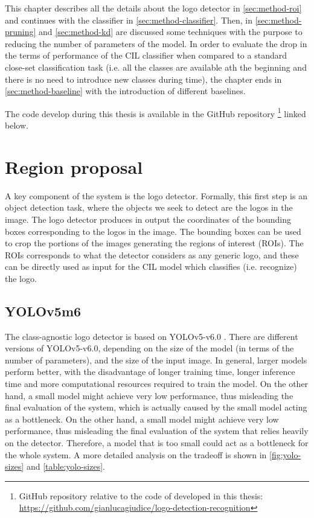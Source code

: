 \vspace{1.5\baselineskip}
This chapter describes all the details about the logo detector in \autoref{sec:method-roi} and continues with the classifier in \autoref{sec:method-classifier}. Then, in \autoref{sec:method-pruning} and \autoref{sec:method-kd} are discussed some techniques with the purpose to reducing the number of parameters of the model. In order to evaluate the drop in the terms of performance of the CIL classifier when compared to a standard close-set classification task (i.e. all the classes are available ath the beginning and there is no need to introduce new classes during time),
the chapter ends in \autoref{sec:method-baseline} with the introduction of different baselines.

The code develop during this thesis is available in the GitHub repository \footnote{GitHub repository relative to the code of developed in this thesis: \\ \href{https://github.com/gianlucagiudice/logo-detection-recognition}{https://github.com/gianlucagiudice/logo-detection-recognition}} linked below.


\section{Region proposal}
A key component of the system is the logo detector. Formally, this first step is an object detection task, where the objects we seek to detect are the logos in the image. The logo detector produces in output the coordinates of the bounding boxes corresponding to the logos in the image. The bounding boxes can be used to crop the portions of the images generating the regions of interest (ROIs). The ROIs corresponds to what the detector considers as any generic logo, and these can be directly used as input for the CIL model which classifies (i.e. recognize) the logo.


\label{sec:method-roi}
\subsection{YOLOv5m6}
The class-agnostic logo detector is based on YOLOv5-v6.0 \cite{glenn_jocher_2021_5563715}. There are different versions of YOLOv5-v6.0, depending on the size of the model (in terms of the number of parameters), and the size of the input image. In general, larger models perform better, with the disadvantage of longer training time, longer inference time and more computational resources required to train the model. On the other hand, a small model might achieve very low performance, thus misleading the final evaluation of the system, which is actually caused by the small model acting as a bottleneck. On the other hand, a small model might achieve very low performance, thus misleading the final evaluation of the system that relies heavily on the detector. Therefore, a model that is too small could act as a bottleneck for the whole system. A more detailed analysis on the tradeoff is shown in \autoref{fig:yolo-sizes} and \autoref{table:yolo-sizes}.

